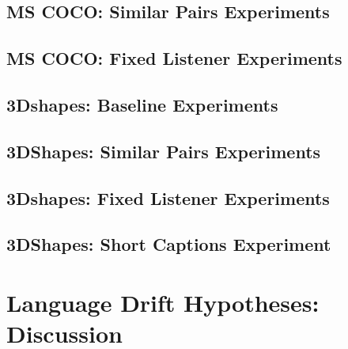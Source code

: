 \subsection{MS COCO: Similar Pairs Experiments}

\subsection{MS COCO: Fixed Listener Experiments}

\subsection{3Dshapes: Baseline Experiments}

\subsection{3DShapes: Similar Pairs Experiments}

\subsection{3Dshapes: Fixed Listener Experiments}

\subsection{3DShapes: Short Captions Experiment}

\section{Language Drift Hypotheses: Discussion}
